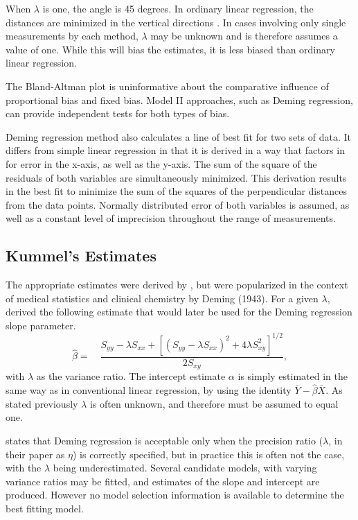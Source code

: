 \documentclass[12pt, a4paper]{report}
\theoremstyle{plain}
\theoremstyle{definition}
\theoremstyle{remark}
\begin{document}
When $\lambda$ is one, the angle is 45 degrees. In ordinary linear regression, the distances are minimized in the vertical directions \citep{linnet99}.
In cases involving only single measurements by each method, $\lambda$ may be unknown and is therefore assumes a value of one. While this will bias the estimates, it is less biased than ordinary linear regression.

The Bland-Altman plot is uninformative about the comparative influence of proportional bias and fixed bias. Model II approaches, such as Deming regression, can provide independent tests for both types of bias.
	
Deming regression method also calculates a line of best fit for two sets of data. It differs from simple linear regression in that it is derived in a way that factors in for error in the x-axis, as well as the y-axis. The sum of the square of the residuals of both variables are simultaneously minimized. This derivation results in the best fit to minimize the sum of the squares of the perpendicular distances from the data points. Normally distributed error of both variables is assumed, as well as a constant level of imprecision throughout the range of measurements.
	


\subsection{Kummel's Estimates}

The appropriate estimates were derived by \citet{Kummel}, but were popularized in the context of medical statistics and clinical chemistry by Deming (1943).
For a given $\lambda$, \citet{Kummel} derived the following estimate that would later be used for the Deming regression slope
parameter. 
\begin{equation}
\hat{\beta} =\quad \frac{S_{yy} - \lambda S_{xx}+[(S_{yy} -
	\lambda S_{xx})^{2}+ 4\lambda S^{2}_{xy}]^{1/2}}{2S_{xy}},
\end{equation}
with $\lambda$ as the variance ratio. The intercept estimate $\alpha$ is simply estimated in the same way as in conventional linear
regression, by using the identity $\bar{Y}-\hat{\beta}\bar{X}$. As stated previously $\lambda$ is often unknown, and therefore must be assumed to equal one. 

\citet{CarollRupert} states that Deming
regression is acceptable only when the precision ratio ($\lambda$, in their paper as $\eta$) is correctly specified, but in practice this is often not the case, with the $\lambda$ being underestimated. Several candidate models, with varying variance ratios may be fitted, and estimates of the slope and intercept are produced. However no model selection information is available to determine the best fitting model.
\end{document}
